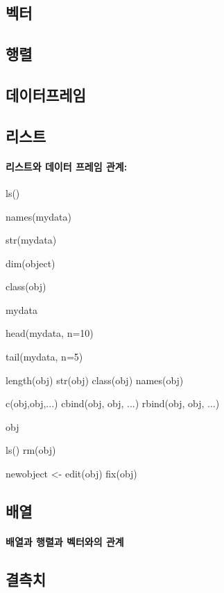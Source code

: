 \documentclass{report}
\begin{document}
\subsection{벡터}

\subsection{행렬}

\subsection{데이터프레임}

\subsection{리스트}
\paragraph{리스트와 데이터 프레임 관계:}
	\begin{Schunk}
	\begin{Soutput}
	ls()

	names(mydata)

	str(mydata)


	dim(object)

	class(obj)

	mydata

	head(mydata, n=10)

	tail(mydata, n=5) 

	length(obj)
	str(obj)
	class(obj)
	names(obj)
	
	c(obj,obj,...)
	cbind(obj, obj, ...)
	rbind(obj, obj, ...)
	
	obj
	
	ls()
	rm(obj)
	
	newobject <- edit(obj)
	fix(obj)
	\end{Soutput}
	\end{Schunk}

\subsection{배열}
\paragraph{배열과 행렬과 벡터와의 관계}

\subsection{결측치}
\end{document}
